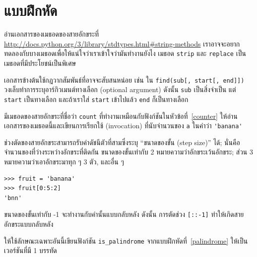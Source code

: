 \section{แบบฝึกหัด}

\begin{exercise}

อ่านเอกสารของเมธอดของสายอักขระที่ 
\url{http://docs.python.org/3/library/stdtypes.html#string-methods}
เราอาจจะอยากทดลองกับบางเมธอดเพื่อให้แน่ใจว่าเราเข้าใจว่ามันทำงานยังไง
เมธอด {\tt strip} และ {\tt replace} เป็นเมธอดที่มีประโยชน์เป็นพิเศษ 

เอกสารข้างต้นใช้กฎวากสัมพันธ์ที่อาจจะสับสนหน่อย เช่น ใน \verb"find(sub[, start[, end]])"
วงเล็บทำการระบุอาร์กิวเมนต์ทางเลือก (optional argument) ดังนั้น {\tt sub} 
เป็นสิ่งจำเป็น แต่ {\tt start} เป็นทางเลือก และถ้าเราใส่ {\tt start} เข้าไปแล้ว 
{\tt end} ก็เป็นทางเลือก

\end{exercise}


\begin{exercise}

มีเมธอดของสายอักขระที่ชื่อว่า {\tt count} ที่ทำงานเหมือนกับฟังก์ชันในหัวข้อที่~\ref{counter}
ให้อ่านเอกสารของเมธอดนี้และเขียนการเรียกใช้ (invocation) ที่นับจำนวนของ {\tt a}
ในคำว่า \verb"'banana'"
\end{exercise}


\begin{exercise}

ช่วงตัดของสายอักขระสามารถรับค่าดัชนีตัวที่สามซึ่งระบุ ``ขนาดของขั้น (step size)'' ได้; นั่นคือ 
จำนวนของที่ว่างระหว่างอักขระที่ติดกัน ขนาดของขั้นเท่ากับ 2 หมายความว่าอักขระเว้นอักขระ;
ส่วน 3 หมายความว่าเอาอักขระมาทุก ๆ 3 ตัว, และอื่น ๆ

\begin{verbatim}
>>> fruit = 'banana'
>>> fruit[0:5:2]
'bnn'
\end{verbatim}

ขนาดของขั้นเท่ากับ -1 จะทำงานกับคำนั้นแบบกลับหลัง ดังนั้น การตัดช่วง \verb"[::-1]" ทำให้เกิดสายอักขระแบบกลับหลัง

ให้ใช้ลักษณะเฉพาะอันนี้เขียนฟังก์ชัน \verb"is_palindrome" จากแบบฝึกหัดที่~\ref{palindrome} 
ให้เป็นเวอร์ชันที่มี 1 บรรทัด
\end{exercise}


